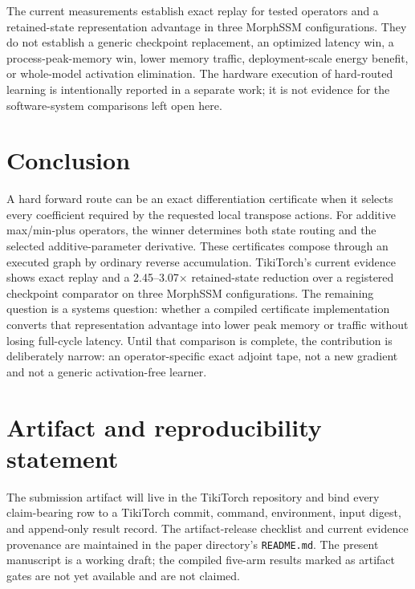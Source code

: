 \documentclass[10pt]{article}
\newcommand{\code}[1]{\texttt{#1}}
\begin{document}
The current measurements establish exact replay for tested operators and a
retained-state representation advantage in three MorphSSM configurations.
They do not establish a generic checkpoint replacement, an optimized latency
win, a process-peak-memory win, lower memory traffic, deployment-scale energy
benefit, or whole-model activation elimination.  The hardware execution of
hard-routed learning is intentionally reported in a separate work; it is not
evidence for the software-system comparisons left open here.

\section{Conclusion}

A hard forward route can be an exact differentiation certificate when it
selects every coefficient required by the requested local transpose actions.
For additive max/min-plus operators, the winner determines both state routing
and the selected additive-parameter derivative.  These certificates compose
through an executed graph by ordinary reverse accumulation.  TikiTorch's
current evidence shows exact replay and a 2.45--3.07$\times$ retained-state
reduction over a registered checkpoint comparator on three MorphSSM
configurations.  The remaining question is a systems question: whether a
compiled certificate implementation converts that representation advantage
into lower peak memory or traffic without losing full-cycle latency.  Until
that comparison is complete, the contribution is deliberately narrow: an
operator-specific exact adjoint tape, not a new gradient and not a generic
activation-free learner.

\section*{Artifact and reproducibility statement}

The submission artifact will live in the TikiTorch repository and bind every
claim-bearing row to a TikiTorch commit, command, environment, input digest, and
append-only result record.  The artifact-release checklist and current evidence
provenance are maintained in the paper directory's \code{README.md}.  The
present manuscript is a working draft; the compiled five-arm results marked as
artifact gates are not yet available and are not claimed.





\end{document}
